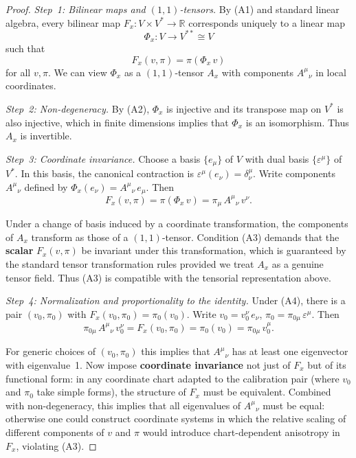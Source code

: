 \documentclass[12pt]{article}
\theoremstyle{remark}
\begin{document}
\begin{proof}
\emph{Step~1: Bilinear maps and $(1,1)$-tensors.}
By (A1) and standard linear algebra, every bilinear map $F_x\colon V \times V^* \to \mathbb{R}$ corresponds uniquely to a linear map
\begin{equation}
    \Phi_x\colon V \to V^{**} \cong V
\end{equation}
such that
\begin{equation}
    F_x(v, \pi) = \pi(\Phi_x\, v)
\end{equation}
for all $v, \pi$. We can view $\Phi_x$ as a $(1,1)$-tensor $A_x$ with components $A^\mu{}_\nu$ in local coordinates.

\medskip
\emph{Step~2: Non-degeneracy.}
By (A2), $\Phi_x$ is injective and its transpose map on $V^*$ is also injective, which in finite dimensions implies that $\Phi_x$ is an isomorphism. Thus $A_x$ is invertible.

\medskip
\emph{Step~3: Coordinate invariance.}
Choose a basis $\{e_\mu\}$ of $V$ with dual basis $\{\varepsilon^\mu\}$ of $V^*$. In this basis, the canonical contraction is $\varepsilon^\mu(e_\nu) = \delta^\mu_\nu$. Write components $A^\mu{}_\nu$ defined by $\Phi_x(e_\nu) = A^\mu{}_\nu\, e_\mu$. Then
\begin{equation}
    F_x(v, \pi) = \pi(\Phi_x\, v) = \pi_\mu\, A^\mu{}_\nu\, v^\nu.
\end{equation}

Under a change of basis induced by a coordinate transformation, the components of $A_x$ transform as those of a $(1,1)$-tensor. Condition (A3) demands that the \textbf{scalar} $F_x(v, \pi)$ be invariant under this transformation, which is guaranteed by the standard tensor transformation rules provided we treat $A_x$ as a genuine tensor field. Thus (A3) is compatible with the tensorial representation above.

\medskip
\emph{Step~4: Normalization and proportionality to the identity.}
Under (A4), there is a pair $(v_0, \pi_0)$ with $F_x(v_0, \pi_0) = \pi_0(v_0)$. Write $v_0 = v_0^\nu\, e_\nu$, $\pi_0 = \pi_{0\mu}\, \varepsilon^\mu$. Then
\begin{equation}
    \pi_{0\mu}\, A^\mu{}_\nu\, v_0^\nu
    = F_x(v_0, \pi_0)
    = \pi_0(v_0)
    = \pi_{0\mu}\, v_0^\mu.
\end{equation}

For generic choices of $(v_0, \pi_0)$ this implies that $A^\mu{}_\nu$ has at least one eigenvector with eigenvalue~1. Now impose \textbf{coordinate invariance} not just of $F_x$ but of its functional form: in any coordinate chart adapted to the calibration pair (where $v_0$ and $\pi_0$ take simple forms), the structure of $F_x$ must be equivalent. Combined with non-degeneracy, this implies that all eigenvalues of $A^\mu{}_\nu$ must be equal: otherwise one could construct coordinate systems in which the relative scaling of different components of $v$ and $\pi$ would introduce chart-dependent anisotropy in $F_x$, violating (A3).


\end{proof}
\end{document}
